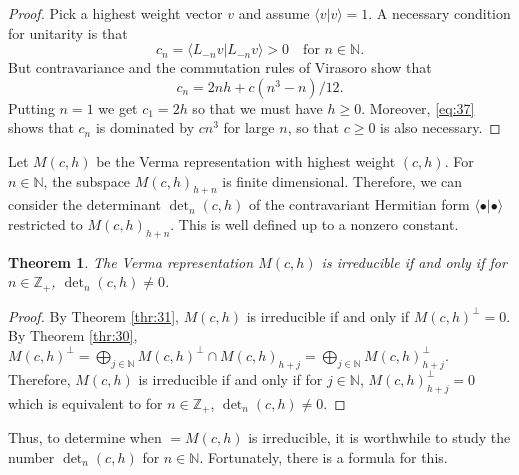 \documentclass[a4paper, 12pt, reqno]{amsart}
\newtheorem{theorem}{Theorem}[section]
\theoremstyle{remark}
\numberwithin{equation}{subsection}
\begin{document}
\begin{proof}
  Pick a highest weight vector $v$ and assume $\langle v| v\rangle = 1$.
  A necessary condition for unitarity is that
  \begin{equation*}
    c_n = \langle L_{-n}v| L_{-n}v\rangle > 0 \quad \text{for } n \in \mathbb{N}.
  \end{equation*}
  But contravariance and the commutation rules of Virasoro show that
  \begin{equation}
    \label{eq:37}
    c_n = 2nh + c(n^3 - n)/12.
  \end{equation}
  Putting $n = 1$ we get $c_1 = 2h$ so that we must have $h \ge 0$.
  Moreover, \eqref{eq:37} shows that $c_n$ is dominated by $cn^3$ for large $n$, so that $c \ge 0$ is also necessary.
\end{proof}

Let $M(c, h)$ be the Verma representation with highest weight $(c, h)$.
For $n \in \mathbb{N}$, the subspace $M(c, h)_{h + n}$ is finite dimensional.
Therefore, we can consider the determinant $\det_n(c, h)$ of the contravariant Hermitian form $\langle \bullet| \bullet\rangle$ restricted to $M(c, h)_{h + n}$.
This is well defined up to a nonzero constant.

\begin{theorem}
  \label{thr:33}
  The Verma representation $M(c, h)$ is irreducible if and only if for $n \in \mathbb{Z}_+$, $\det_n(c, h) \neq 0$.
\end{theorem}

\begin{proof}
  By Theorem \ref{thr:31}, $M(c, h)$ is irreducible if and only if $M(c, h)^{\perp} = 0$.
  By Theorem \ref{thr:30}, $M(c, h)^{\perp} = \bigoplus_{j \in \mathbb{N}}M(c, h)^{\perp} \cap M(c, h)_{h + j} = \bigoplus_{j \in \mathbb{N}}M(c, h)_{h + j}^{\perp}$.
  Therefore, $M(c, h)$ is irreducible if and only if for $j \in \mathbb{N}$, $M(c, h)_{h + j}^{\perp} = 0$ which is equivalent to for $n \in \mathbb{Z}_+$, $\det_n(c, h) \neq 0$.
\end{proof}

Thus, to determine when $=M(c, h)$ is irreducible, it is worthwhile to study the number $\det_n(c, h)$ for $n \in \mathbb{N}$.
Fortunately, there is a formula for this.
\end{document}
